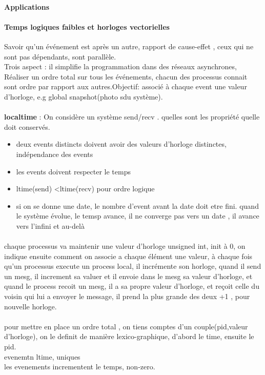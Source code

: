 \documentclass{article}
\begin{document}
\paragraph{Applications}
\paragraph{Temps logiques faibles et horloges vectorielles}
Savoir qu'un événement est après un autre, rapport de cause-effet , ceux qui ne sont pas dépendants, sont parallèle. \\Trois aspect : il simplifie la programmation dans des réseaux asynchrones, Réaliser un ordre total sur tous les événements, chacun des processus connait sont ordre par rapport aux autres.Objectif: associé à chaque event une valeur d'horloge, e.g global snapshot(photo sdu système).\\\\\textbf{localtime} : On considère un système send/recv . quelles sont les propriété quelle doit conservés.
\begin{itemize}
\item deux events distincts doivent avoir des valeurs d'horloge distinctes, indépendance des events
\item les events doivent respecter le temps
\item ltime(send) <ltime(recv) pour ordre logique
\item si on se donne une date, le nombre d'event avant la date doit etre fini. quand le système évolue, le temsp avance, il ne converge pas vers un date , il  avance vers l'infini et au-delà
\end{itemize}

\paragraph{} chaque processus va maintenir une valeur d'horloge unsigned int, init à 0, on indique ensuite comment on associe a chaque élément une valeur, à chaque fois qu'un processus execute un process local, il incrémente son horloge, quand il send un mesg, il increment sa valuer et il envoie dans le mesg sa valeur d'horloge, et quand le process  recoit un mesg, il a sa propre valeur d'horloge, et reçoit celle du voisin qui lui a envoyer le message, il prend la plus grande des deux +1 , pour nouvelle horloge.\\\\pour mettre en place un ordre total , on tiens comptes d'un couple(pid,valeur d'horloge), on le definit de manière lexico-graphique, d'abord le time, ensuite le pid.\\evenemtn ltime, uniques\\les evenements incrementent le temps, non-zero.
\end{document}

